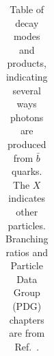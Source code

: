\begin{table}
\begin{tabular}{ccll}
      \end{tabular}
      \caption[$b$ Quark Production of Gamma Rays]{
        Table of decay modes and products, indicating several ways photons are produced from $\bar{b}$ quarks.
        The $X$ indicates other particles.
        Branching ratios and Particle Data Group (PDG) chapters are from Ref.~\cite{tanabashi2018review}.
      }
      \label{tab:bpaths2}
    \end{table}
    

